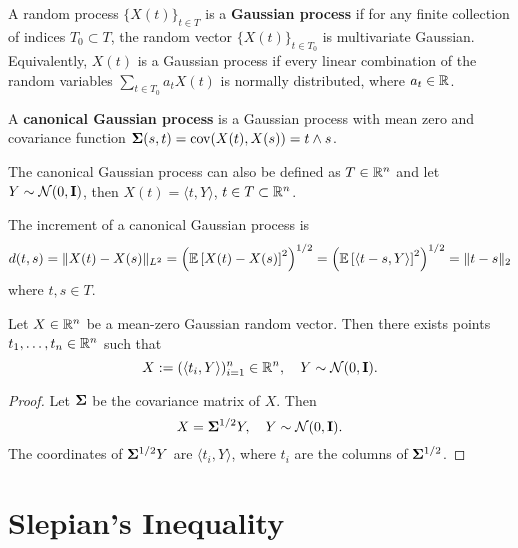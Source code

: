 \begin{definition}
    A random process \(\{X(t)\}_{t\in T}\) is a \textbf{Gaussian process} if for any finite collection of indices \(T_{0}\subset T\), the random vector \(\{X(t)\}_{t\in T_{0}}\) is multivariate Gaussian. Equivalently, \(X(t)\) is a Gaussian process if every linear combination of the random variables \(\sum_{t\in T_{0}}a_{t}X(t)\) is normally distributed, where \(a_{t}\in{\mathbb R}\).
\end{definition}

\begin{definition}
    A \textbf{canonical Gaussian process} is a Gaussian process with mean zero and covariance function \(\boldsymbol{\Sigma}(s,t)=\operatorname{cov}(X(t),X(s))=t\wedge s\).
\end{definition}

\begin{remark}
    The canonical Gaussian process can also be defined as \(T\in{\mathbb R}^{n}\) and let \(Y\sim{\mathcal N}(0,{\bf I})\), then \(X(t)=\langle t,Y\rangle\), \(t\in T\subset{\mathbb R}^{n}\).
\end{remark}

The increment of a canonical Gaussian process is
\begin{equation*}
    d(t,s)=\|X(t)-X(s)\|_{L^{2}}=\left({\mathbb E}\left[X(t)-X(s)\right]^{2}\right)^{1/2}=\left({\mathbb E}\left[\langle t-s,Y\rangle\right]^{2}\right)^{1/2}=\|t-s\|_{2}
\end{equation*}
where \(t,s\in T\).

\begin{lemma}
    Let \(X\in{\mathbb R}^{n}\) be a mean-zero Gaussian random vector. Then there exists points \(t_{1},\ldots,t_{n}\in{\mathbb R}^{n}\) such that
    \begin{equation*}
        X:=(\langle t_{i},Y\rangle)_{i=1}^{n}\in{\mathbb R}^{n},\quad Y\sim{\mathcal N}(0,{\bf I}).
    \end{equation*}
\end{lemma}

\begin{proof}
    Let \(\boldsymbol{\Sigma}\) be the covariance matrix of \(X\). Then 
    \begin{equation*}
        X=\boldsymbol{\Sigma}^{1/2}Y,\quad Y\sim{\mathcal N}(0,{\bf I}).
    \end{equation*}
    The coordinates of \(\boldsymbol{\Sigma}^{1/2}Y\) are \(\langle t_{i},Y\rangle\), where \(t_{i}\) are the columns of \(\boldsymbol{\Sigma}^{1/2}\).
\end{proof}

\section{Slepian's Inequality}

